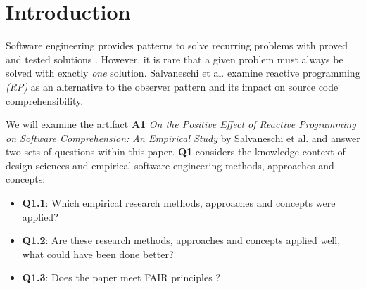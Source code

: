 \documentclass[11pt,a4paper,twocolumn]{article}
\begin{document}

	\section{Introduction}
	Software engineering provides patterns to solve recurring problems with proved and tested solutions \cite{159342}. However, it is rare that a given problem must always be solved with exactly \emph{one} solution. Salvaneschi et al. \cite{7827078} examine reactive programming \emph{(RP)} as an alternative to the observer pattern \cite{gamma1995design} and its impact on source code comprehensibility.

	We will examine the artifact \textbf{A1} \cite{balestra:2019:designscience:articactandcontext} \emph{On the Positive Effect of Reactive Programming on Software Comprehension: An Empirical Study} by Salvaneschi et al. \cite{7827078} and answer two sets of questions within this paper. \textbf{Q1} considers the knowledge context \cite{balestra:2019:designscience:articactandcontext} of design sciences and empirical software engineering methods, approaches and concepts:

	\begin{itemize}
		\item \textbf{Q1.1}: Which empirical research methods, approaches and concepts were applied?
		\item \textbf{Q1.2}: Are these research methods, approaches and concepts applied well, what could have been done better?
		\item \textbf{Q1.3}: Does the paper meet FAIR principles \cite{2019arXiv190805986H} \cite{wilkinson:2016}?
	\end{itemize}
\end{document}
